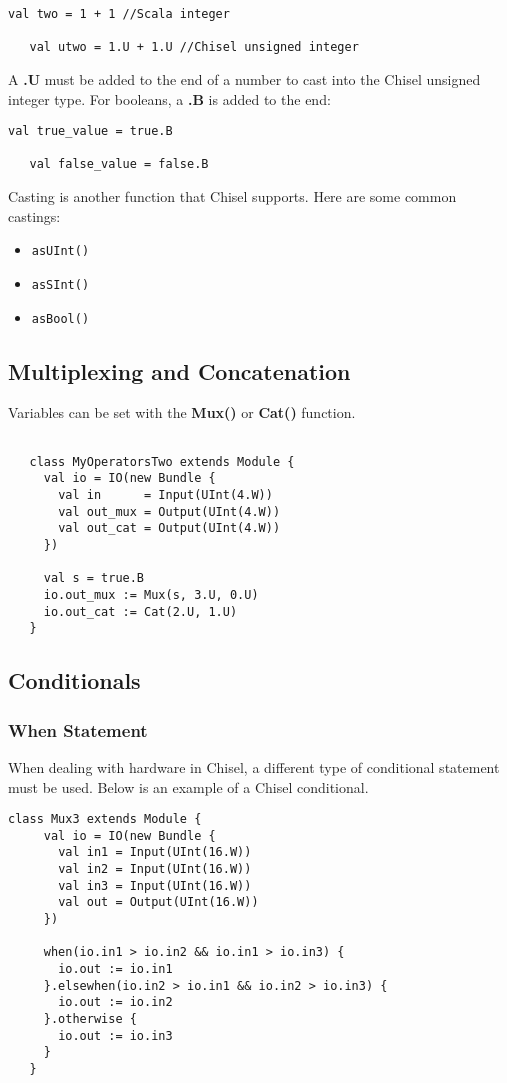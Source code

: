 \documentclass[12pt, letterpaper]{report}
\begin{document}
\begin{lstlisting}[style=scala]
   val two = 1 + 1 //Scala integer

   val utwo = 1.U + 1.U //Chisel unsigned integer

\end{lstlisting}

A \textbf{.U} must be added to the end of a number to cast into the Chisel unsigned integer type. For booleans, a \textbf{.B} is added to the end:

\begin{lstlisting}[style=scala]
   val true_value = true.B
   
   val false_value = false.B
\end{lstlisting}

Casting is another function that Chisel supports. Here are some common castings:

\begin{itemize}
   \item \verb|asUInt()|
   \item \verb|asSInt()|
   \item \verb|asBool()|
\end{itemize}
\pagebreak
\subsection{Multiplexing and Concatenation}
Variables can be set with the \textbf{Mux()} or \textbf{Cat()} function.
\begin{lstlisting}[style=scala]

   class MyOperatorsTwo extends Module {
     val io = IO(new Bundle {
       val in      = Input(UInt(4.W))
       val out_mux = Output(UInt(4.W))
       val out_cat = Output(UInt(4.W))
     })

     val s = true.B
     io.out_mux := Mux(s, 3.U, 0.U) 
     io.out_cat := Cat(2.U, 1.U)    
   }
\end{lstlisting}
\subsection{Conditionals}
\subsubsection{When Statement}
When dealing with hardware in Chisel, a different type of conditional statement must be used. 
Below is an example of a Chisel conditional.

\begin{lstlisting}[style=scala]
   class Mux3 extends Module {
     val io = IO(new Bundle {
       val in1 = Input(UInt(16.W))
       val in2 = Input(UInt(16.W))
       val in3 = Input(UInt(16.W))
       val out = Output(UInt(16.W))
     })
    
     when(io.in1 > io.in2 && io.in1 > io.in3) {
       io.out := io.in1  
     }.elsewhen(io.in2 > io.in1 && io.in2 > io.in3) {
       io.out := io.in2 
     }.otherwise {
       io.out := io.in3
     }
   }
\end{lstlisting}
\end{document}
